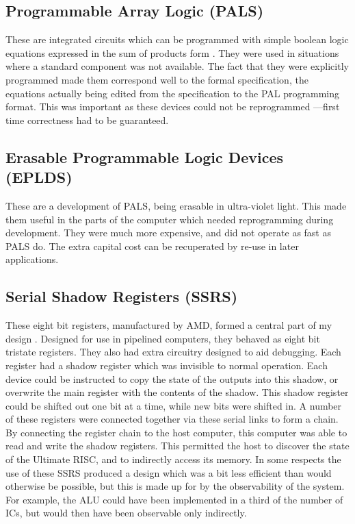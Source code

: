 \subsection{Programmable Array Logic (PALS)}

These are integrated circuits which can be programmed with simple boolean logic equations expressed in the sum of products form \cite{mmi:pals}. 
They were used in situations where a standard component was not available. 
The fact that they were explicitly programmed  made them correspond well to the formal specification, the equations actually being edited
from the specification to the PAL programming format. 
This was important as these devices could not be reprogrammed ---first time correctness had to be guaranteed.

\subsection{Erasable Programmable Logic Devices (EPLDS)}

These are a development of PALS, being erasable in ultra-violet light.
 This made them useful in the parts of the computer which needed reprogramming during development. 
They were much more expensive, and did not operate as fast as PALS do. 
The extra capital cost can be recuperated  by re-use in later applications.


\subsection{Serial Shadow Registers (SSRS)}
These eight bit registers, manufactured by AMD, formed a central part of my design \cite{amd:logic,amd:uprogramming}. 
Designed for use in pipelined computers, they  behaved as   eight bit tristate registers. 
They also had extra  circuitry designed to aid debugging. Each register had a shadow register which was invisible to normal operation. 
Each device could be instructed to copy the state of the outputs into this shadow, or overwrite the main register with the contents of the shadow. 
This shadow register could be shifted out one bit at a time, while  new bits were shifted in. 
 A number of these registers were connected together  via these serial links to form a chain.
 By connecting the register chain to the host computer, this computer was able to read and write  the shadow registers.
 This permitted the host to  discover the state of the Ultimate RISC, and to indirectly access its memory.
In some respects the use of these SSRS produced a design which was a bit less efficient than would otherwise be possible, but this is made up for by the observability of the system.
For example,  the ALU could have been implemented in a third of the number of ICs, but would then have been observable only indirectly. 

